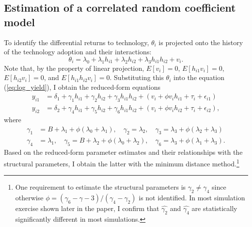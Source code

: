 \documentclass[11pt,letterpaper]{article}
\begin{document}
\subsection{Estimation of a correlated random coefficient model}

To identify the differential returns to technology, $\theta_i$ is projected onto the history of the technology adoption and their interactions:
\begin{equation}\label{eq:linear_projection}
  \theta_i = \lambda_0 + \lambda_1 h_{i1} + \lambda_2 h_{i2} + \lambda_3 h_{i1} h_{i2} + v_i.
\end{equation}
Note that, by the property of linear projection, $E[v_i] = 0$, $E[h_{i1} v_i] = 0$, $E[h_{i2} v_i] = 0$, and $E[h_{i1} h_{i2} v_i] = 0$.
Substituting this $\theta_i$ into the equation (\ref{eq:log_yield}), I obtain the reduced-form equations
\begin{align*}
  y_{i1} &= \delta_1 + \gamma_1 h_{i1} + \gamma_2 h_{i2} + \gamma_3 h_{i1} h_{i2} + (v_i + \phi v_i h_{i1} + \tau_i + \epsilon_{i1}) \\
  y_{i2} &= \delta_2 + \gamma_4 h_{i1} + \gamma_5 h_{i2} + \gamma_6 h_{i1} h_{i2} + (v_i + \phi v_i h_{i2} + \tau_i + \epsilon_{i2}),
\end{align*}
where
\begin{align*}
  \gamma_1 &= B + \lambda_1 + \phi (\lambda_0 + \lambda_1), \quad \gamma_2 = \lambda_2, \quad \gamma_3 = \lambda_3 + \phi (\lambda_2 + \lambda_3) \\
  \gamma_4 &= \lambda_1, \quad  \gamma_5 = B + \lambda_2 + \phi (\lambda_0 + \lambda_2), \quad \gamma_6 = \lambda_3 + \phi (\lambda_1 + \lambda_3).
\end{align*}
Based on the reduced-form parameter estimates and their relationships with the structural parameters, I obtain the latter with the minimum distance method.\footnote{
  One requirement to estimate the structural parameters is $\gamma_2 \ne \gamma_4$ since otherwise $\phi = (\gamma_6 - \gamma-3) / (\gamma_4 - \gamma_2)$ is not identified.
  In most simulation exercise shown later in the paper, I confirm that $\widehat{\gamma_2}$ and $\widehat{\gamma_4}$ are statistically significantly different in most simulations.
}
\end{document}
